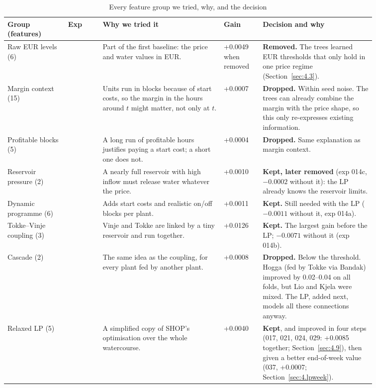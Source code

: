 \begin{table}[H]
  \centering\small
  \caption{Every feature group we tried, why, and the decision}
  \label{tab:4.tried}
  \begin{tabular}{>{\raggedright\arraybackslash}p{0.14\linewidth}>{\raggedright\arraybackslash}p{0.08\linewidth}>{\raggedright\arraybackslash}p{0.29\linewidth}>{\raggedright\arraybackslash}p{0.09\linewidth}>{\raggedright\arraybackslash}p{0.26\linewidth}}
    \toprule
    \textbf{Group (features)} & \textbf{Exp} & \textbf{Why we tried it} & \textbf{Gain} & \textbf{Decision and why} \\
    \midrule
    Raw EUR levels (6) & 002 & Part of the first baseline: the price and water values in EUR. & +0.0049 when removed & \textbf{Removed.} The trees learned EUR thresholds that only hold in one price regime (Section~\ref{sec:4.3}). \\
    Margin context (15) & 005 & Units run in blocks because of start costs, so the margin in the hours around $t$ might matter, not only at $t$. & +0.0007 & \textbf{Dropped.} Within seed noise. The trees can already combine the margin with the price shape, so this only re-expresses existing information. \\
    Profitable blocks (5) & 006 & A long run of profitable hours justifies paying a start cost; a short one does not. & +0.0004 & \textbf{Dropped.} Same explanation as margin context. \\
    Reservoir pressure (2) & 007 & A nearly full reservoir with high inflow must release water whatever the price. & +0.0010 & \textbf{Kept, later removed} (exp 014c, $-0.0002$ without it): the LP already knows the reservoir limits. \\
    Dynamic programme (6) & 008 & Adds start costs and realistic on/off blocks per plant. & +0.0011 & \textbf{Kept.} Still needed with the LP ($-0.0011$ without it, exp 014a). \\
    Tokke--Vinje coupling (3) & 009 & Vinje and Tokke are linked by a tiny reservoir and run together. & +0.0126 & \textbf{Kept.} The largest gain before the LP; $-0.0071$ without it (exp 014b). \\
    Cascade (2) & 011 & The same idea as the coupling, for every plant fed by another plant. & +0.0008 & \textbf{Dropped.} Below the threshold. Hogga (fed by Tokke via Bandak) improved by 0.02--0.04 on all folds, but Lio and Kjela were mixed. The LP, added next, models all these connections anyway. \\
    Relaxed LP (5) & 013 & A simplified copy of SHOP's optimisation over the whole watercourse. & +0.0040 & \textbf{Kept}, and improved in four steps (017, 021, 024, 029: +0.0085 together; Section~\ref{sec:4.9}), then given a better end-of-week value (037, +0.0007; Section~\ref{sec:4.lpweek}). \\

\end{tabular}
\end{table}
